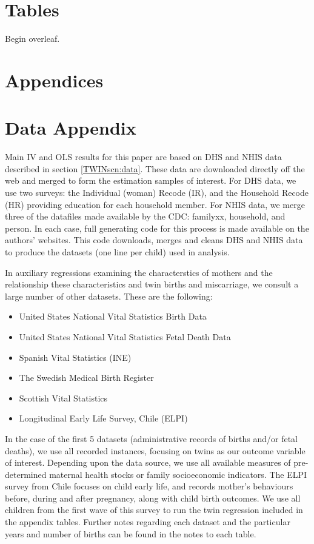 \documentclass[subeqn]{article}
\begin{document}
\begin{spacing}{1.4}
\section*{Tables}
Begin overleaf.

\clearpage




\newpage
\appendix
\section*{Appendices}
\section{Data Appendix}
\label{TWINscn:dataApp}
Main IV and OLS results for this paper are based on DHS and NHIS data described 
in section \ref{TWINscn:data}.  These data are downloaded directly off the web 
and merged to form the estimation samples of interest. For DHS data, we use two 
surveys: the Individual (woman) Recode (IR), and the Household Recode (HR) 
providing education for each household member.  For NHIS data, we merge three 
of the datafiles made available by the CDC: familyxx, household, and person.
In each case, full generating code for this process is made available on the
authors' websites.  This code downloads, merges and cleans DHS and NHIS data to
produce the datasets (one line per child) used in analysis.

In auxiliary regressions examining the characterstics of mothers and the 
relationship these characteristics and twin births and miscarriage, we consult
a large number of other datasets.  These are the following:
\begin{itemize}
\item United States National Vital Statistics Birth Data
\item United States National Vital Statistics Fetal Death Data
\item Spanish Vital Statistics (INE)
\item The Swedish Medical Birth Register
\item Scottish Vital Statistics
\item Longitudinal Early Life Survey, Chile (ELPI) 
\end{itemize}

In the case of the first 5 datasets (administrative records of births and/or 
fetal deaths), we use all recorded instances, focusing on twins as our 
outcome variable of interest.  Depending upon the data source, we use all
available measures of pre-determined maternal health stocks or family 
socioeconomic indicators.  The ELPI survey from Chile focuses on child early
life, and records mother's behaviours before, during and after pregnancy,
along with child birth outcomes.  We use all children from the first wave of
this survey to run the twin regression included in the appendix tables.  
Further notes regarding each dataset and the particular years and number of
births can be found in the notes to each table.


\end{spacing}
\end{document}
